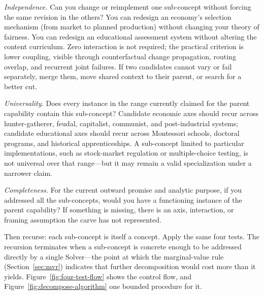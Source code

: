 \documentclass[11pt]{article}
\begin{document}
\emph{Independence.} Can you change or reimplement one sub-concept without forcing the same revision in the others? You can redesign an economy's selection mechanism (from market to planned production) without changing your theory of fairness. You can redesign an educational assessment system without altering the content curriculum. Zero interaction is not required; the practical criterion is lower coupling, visible through counterfactual change propagation, routing overlap, and recurrent joint failures. If two candidates cannot vary or fail separately, merge them, move shared context to their parent, or search for a better cut.

\emph{Universality.} Does every instance in the range currently claimed for the parent capability contain this sub-concept? Candidate economic axes should recur across hunter-gatherer, feudal, capitalist, communist, and post-industrial systems; candidate educational axes should recur across Montessori schools, doctoral programs, and historical apprenticeships. A sub-concept limited to particular implementations, such as stock-market regulation or multiple-choice testing, is not universal over that range---but it may remain a valid specialization under a narrower claim.

\emph{Completeness.} For the current outward promise and analytic purpose, if you addressed all the sub-concepts, would you have a functioning instance of the parent capability? If something is missing, there is an axis, interaction, or framing assumption the carve has not represented.

Then recurse: each sub-concept is itself a concept. Apply the same four tests. The recursion terminates when a sub-concept is concrete enough to be addressed directly by a single Solver---the point at which the marginal-value rule (Section~\ref{sec:mvr}) indicates that further decomposition would cost more than it yields. Figure~\ref{fig:four-test-flow} shows the control flow, and Figure~\ref{fig:decompose-algorithm} one bounded procedure for it.
\end{document}
